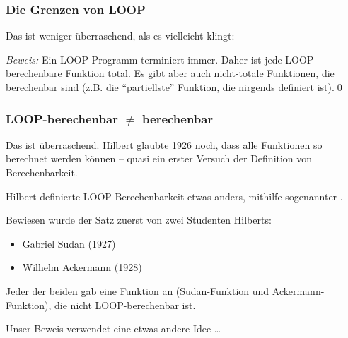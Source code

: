 \documentclass[aspectratio=1610,onlymath]{beamer}
\begin{document}
\begin{frame}\frametitle{Die Grenzen von LOOP}

\pause

Das ist weniger überraschend, als es vielleicht klingt:\smallskip

\emph{Beweis:} Ein LOOP-Programm terminiert immer. Daher ist jede LOOP-berechenbare Funktion total. Es gibt aber auch nicht-totale Funktionen, die berechenbar sind (z.B. die ``partiellste'' Funktion, die nirgends definiert ist).\qed
% 
% 
% 

\end{frame}


\begin{frame}\frametitle{LOOP-berechenbar $\neq$ berechenbar}

\pause

Das ist überraschend. Hilbert glaubte 1926 noch, dass alle Funktionen so berechnet werden können -- quasi ein erster Versuch der Definition von Berechenbarkeit.

{\tiny Hilbert definierte LOOP-Berechenbarkeit etwas anders, mithilfe sogenannter .
}\pause\bigskip

Bewiesen wurde der Satz zuerst von zwei Studenten Hilberts:
\begin{itemize}
\item Gabriel Sudan (1927)
\item Wilhelm Ackermann (1928)
\end{itemize}\pause
Jeder der beiden gab eine Funktion an (Sudan-Funktion und Ackermann-Funktion), die nicht LOOP-berechenbar ist.
\bigskip

Unser Beweis verwendet eine etwas andere Idee \ldots

\end{frame}
\end{document}
